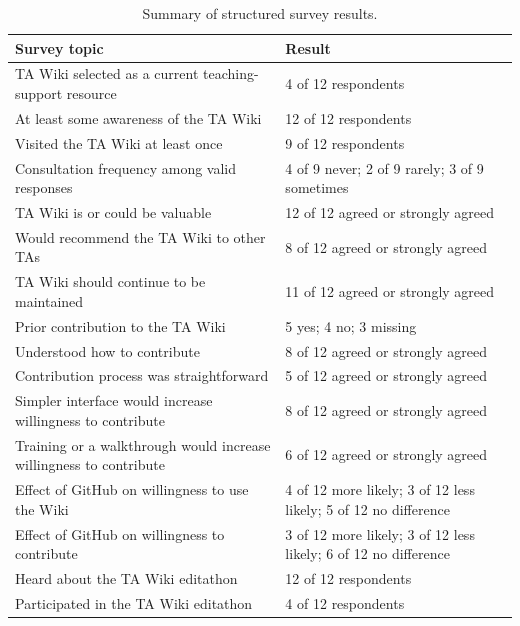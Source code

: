 \documentclass[11pt]{article}
\begin{document}
\begin{table}[htbp]
\centering
\caption{Summary of structured survey results.}
\label{tab:structured-results}
\begin{tabular}{@{}p{}p{}@{}}
\toprule
Survey topic & Result \\
\midrule
TA Wiki selected as a current teaching-support resource & 4 of 12 respondents \\
At least some awareness of the TA Wiki & 12 of 12 respondents \\
Visited the TA Wiki at least once & 9 of 12 respondents \\
Consultation frequency among valid responses & 4 of 9 never; 2 of 9 rarely; 3 of 9 sometimes \\
TA Wiki is or could be valuable & 12 of 12 agreed or strongly agreed \\
Would recommend the TA Wiki to other TAs & 8 of 12 agreed or strongly agreed \\
TA Wiki should continue to be maintained & 11 of 12 agreed or strongly agreed \\
Prior contribution to the TA Wiki & 5 yes; 4 no; 3 missing \\
Understood how to contribute & 8 of 12 agreed or strongly agreed \\
Contribution process was straightforward & 5 of 12 agreed or strongly agreed \\
Simpler interface would increase willingness to contribute & 8 of 12 agreed or strongly agreed \\
Training or a walkthrough would increase willingness to contribute & 6 of 12 agreed or strongly agreed \\
Effect of GitHub on willingness to use the Wiki & 4 of 12 more likely; 3 of 12 less likely; 5 of 12 no difference \\
Effect of GitHub on willingness to contribute & 3 of 12 more likely; 3 of 12 less likely; 6 of 12 no difference \\
Heard about the TA Wiki editathon & 12 of 12 respondents \\
Participated in the TA Wiki editathon & 4 of 12 respondents \\
\bottomrule
\end{tabular}
\end{table}
\end{document}
